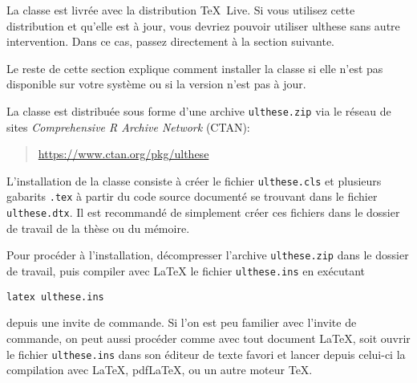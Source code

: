 \documentclass[11pt,french]{article}
\newcommand{\class}[1]{\textsf{#1}}
\newcommand{\fichier}[1]{\texttt{#1}}
\begin{document}
La classe est livrée avec la distribution {\TeX}~Live. Si vous
utilisez cette distribution et qu'elle est à jour, vous devriez
pouvoir utiliser \class{ulthese} sans autre intervention. Dans ce
cas, passez directement à la section suivante.

Le reste de cette section explique comment installer la classe si
elle n'est pas disponible sur votre système ou si la version n'est
pas à jour.

La classe est distribuée sous forme d'une archive
\fichier{ulthese.zip} via le réseau de sites \emph{Comprehensive R
  Archive Network} (CTAN):
\begin{quote}
  \url{https://www.ctan.org/pkg/ulthese}
\end{quote}

L'installation de la classe consiste à créer le fichier
\fichier{ulthese.cls} et plusieurs gabarits \fichier{.tex} à partir du
code source documenté se trouvant dans le fichier
\fichier{ulthese.dtx}. Il est recommandé de simplement créer ces
fichiers dans le dossier de travail de la thèse ou du mémoire.

Pour procéder à l'installation, décompresser l'archive
\fichier{ulthese.zip} dans le dossier de travail, puis compiler avec
{\LaTeX} le fichier \fichier{ulthese.ins} en exécutant
\begin{verbatim}
latex ulthese.ins
\end{verbatim}
depuis une invite de commande. Si l'on est peu familier avec l'invite
de commande, on peut aussi procéder comme avec tout document {\LaTeX},
soit ouvrir le fichier \fichier{ulthese.ins} dans son éditeur de texte
favori et lancer depuis celui-ci la compilation avec {\LaTeX},
pdf{\LaTeX}, {\XeLaTeX} ou un autre moteur {\TeX}.
\end{document}

